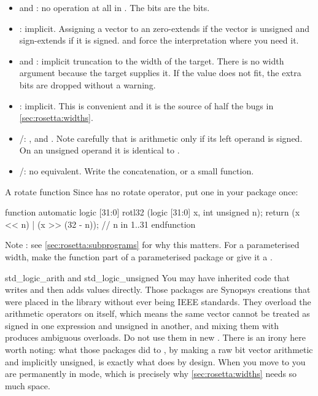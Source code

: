 \begin{itemize}
  \item {} and : no operation at
        all in \SV{}. The bits are the bits.
  \item {}: implicit. Assigning a vector to an 
        zero-extends if the vector is unsigned and sign-extends if it is
        signed.  and  force the
        interpretation where you need it.
  \item {} and : implicit
        truncation to the width of the target. There is no width argument
        because the target supplies it. If the value does not fit, the extra
        bits are dropped without a warning.
  \item {}: implicit. This is convenient and it is the source
        of half the bugs in \cref{sec:rosetta:widths}.
  \item {}/: \code{<<}, \code{>>} and
        \code{>>>}. Note carefully that \code{>>>} is arithmetic only if its
        left operand is signed. On an unsigned operand it is identical to
        \code{>>}.
  \item {}/: no equivalent. Write the
        concatenation, or a small function.
\end{itemize}

\begin{tipbox}{A rotate function}
Since \SV{} has no rotate operator, put one in your package once:
\begin{svcode}
function automatic logic [31:0] rotl32 (logic [31:0] x, int unsigned n);
  return (x << n) | (x >> (32 - n));   // n in 1..31
endfunction
\end{svcode}
Note : see \cref{sec:rosetta:subprograms} for why this matters.
For a parameterised width, make the function part of a parameterised package or
give it a .
\end{tipbox}

\begin{notebox}{std\_logic\_arith and std\_logic\_unsigned}
You may have inherited code that writes 
and then adds  values directly. Those packages are
Synopsys creations that were placed in the  library without ever
being IEEE standards. They overload the arithmetic operators on
 itself, which means the same vector cannot be treated
as signed in one expression and unsigned in another, and mixing them with
 produces ambiguous overloads. Do not use them in new
\VHDL{}. There is an irony here worth noting: what those packages did to
\VHDL{}, by making a raw bit vector arithmetic and implicitly unsigned, is
exactly what \SV{} does by design. When you move to \SV{} you are permanently
in  mode, which is precisely why
\cref{sec:rosetta:widths} needs so much space.
\end{notebox}

